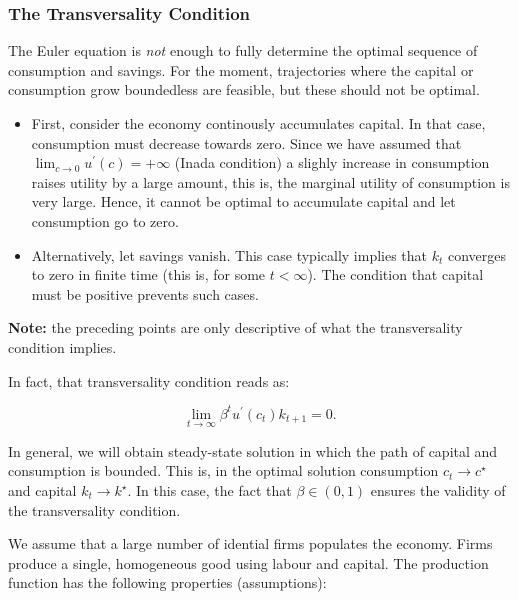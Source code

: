 \documentclass[11pt,a4paper,english]{article}
\providecommand{\tightlist}{%
  \setlength{\itemsep}{0pt}\setlength{\parskip}{0pt}}
\begin{document}
\hypertarget{the-transversality-condition}{%
\subsubsection{The Transversality
Condition}\label{the-transversality-condition}}

The Euler equation is \emph{not} enough to fully determine the optimal
sequence of consumption and savings. For the moment, trajectories where
the capital or consumption grow boundedless are feasible, but these
should not be optimal.

\begin{itemize}
\tightlist
\item
  First, consider the economy continously accumulates capital. In that
  case, consumption must decrease towards zero. Since we have assumed
  that \(\lim_{c \rightarrow 0}u^{\prime}( c )=+\infty\) (Inada
  condition) a slighly increase in consumption raises utility by a large
  amount, this is, the marginal utility of consumption is very large.
  Hence, it cannot be optimal to accumulate capital and let consumption
  go to zero.
\item
  Alternatively, let savings vanish. This case typically implies that
  \(k_{t}\) converges to zero in finite time (this is, for some
  \(t<\infty\)). The condition that capital must be positive prevents
  such cases.
\end{itemize}

\textbf{Note:} the preceding points are only descriptive of what the
transversality condition implies.

In fact, that transversality condition reads as:

\[\lim_{t \rightarrow \infty} \beta^{t}u^{\prime}(c_{t})k_{t+1} = 0.\]

In general, we will obtain steady-state solution in which the path of
capital and consumption is bounded. This is, in the optimal solution
consumption \(c_{t} \rightarrow c^{\star}\) and capital
\(k_{t} \rightarrow k^{\star}\). In this case, the fact that
\(\beta \in (0,1)\) ensures the validity of the transversality
condition.

We assume that a large number of idential firms populates the economy.
Firms produce a single, homogeneous good using labour and capital. The
production function has the following properties (assumptions):
\end{document}
